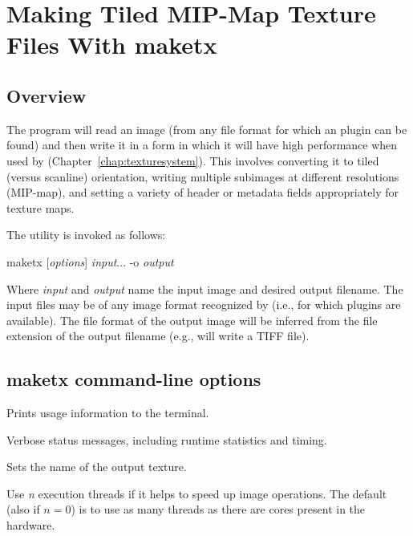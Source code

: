 \chapter{Making Tiled MIP-Map Texture Files With {\cf maketx}}
\label{chap:maketx}

\section{Overview}

The \maketx program will read an image (from any file format for
which an \ImageInput plugin can be found) and then write it in a form
in which it will have high performance when used by \TextureSystem
(Chapter~\ref{chap:texturesystem}).  This involves converting it to
tiled (versus scanline) orientation, writing multiple subimages at
different resolutions (MIP-map), and setting a variety of header or
metadata fields appropriately for texture maps.

The \maketx utility is invoked as follows:

\medskip

\hspace{0.25in} {\cf maketx} [\emph{options}] \emph{input}... -o \emph{output}

\medskip

Where \emph{input} and \emph{output} name the input image and desired
output filename.  The input files may be of any image format recognized by
\product (i.e., for which \ImageInput plugins are available).  The file
format of the output image will be inferred from the file extension of
the output filename (e.g.,  will write a TIFF file).


\section{{\cf maketx} command-line options}

Prints usage information to the terminal.
\apiend

Verbose status messages, including runtime statistics and timing.
\apiend

Sets the name of the output texture.
\apiend

Use \emph{n} execution threads if it helps to speed up image operations.
The default (also if $n=0$) is to use as many threads as there are cores
present in the hardware.
\apiend

